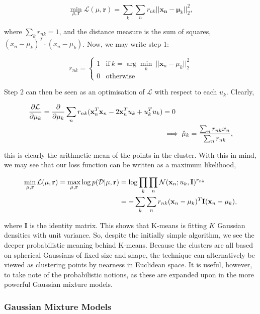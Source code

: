 \documentclass[11pt]{amsart}
\begin{document}
$$\min_{\mu, \mathbf{r}} \mathcal{L}(\mu, \mathbf{r}) = \sum_k\sum_n r_{nk}||\mathbf{x_n} - \mathbf{\mu}_k||^2_2,$$

where $\sum_k r_{nk} = 1$, and the distance measure is the sum of squares, $(x_n - \mu_k)^T\cdot(x_n - \mu_k)$. Now, we may write step 1:

\[r_{nk} = \begin{cases}
    1 & \text{if} \ k = \arg \min_k \ ||\mathbf{x}_n - \mu_k||_2^2 \\
    0 & \text{otherwise}
\end{cases}\]

Step 2 can then be seen as an optimisation of $\mathcal{L}$ with respect to each $u_k$. Clearly,

\begin{align}\frac{\partial\mathcal{L}}{\partial\mu_k} = \frac{\partial}{\partial\mu_k}\sum_n r_{nk} (\mathbf{x}_n^T\mathbf{x}_n - 2\mathbf{x}_n^Tu_k + u_k^Tu_k) &= 0 \notag \\
&\implies \hat{\mu}_k = \frac{\sum_nr_{nk}x_n}{\sum_nr_{nk}}, \notag
\end{align}

this is clearly the arithmetic mean of the points in the cluster. With this in mind, we may see that our loss function can be written as a maximum likelihood,

\begin{align}\min_{\mu, \mathbf{r}} \mathcal{L}(\mu, \mathbf{r}) = \max_{\mu, \mathbf{r}} \log p(\mathcal{D} | \mu, \mathbf{r}) &= \log\prod_k\prod_n \mathcal{N}(\mathbf{x}_n ; u_k, \mathbf{I})^{r_{nk}} \notag \\
&= -\sum_k\sum_nr_{nk}(\mathbf{x}_n - \mu_k)^T\mathbf{I}(\mathbf{x}_n - \mu_k), \notag
\end{align}

where $\mathbf{I}$ is the identity matrix. This shows that K-means is fitting $K$ Gaussian densities with unit variance. So, despite the initially simple algorithm, we see the deeper probabilistic meaning behind K-means. Because the clusters are all based on spherical Gaussians of fixed size and shape, the technique can alternatively be viewed as clustering points by nearness in Euclidean space. It is useful, however, to take note of the probabilistic notions, as these are expanded upon in the more powerful Gaussian mixture models.

\subsubsection{Gaussian Mixture Models}
\end{document}
